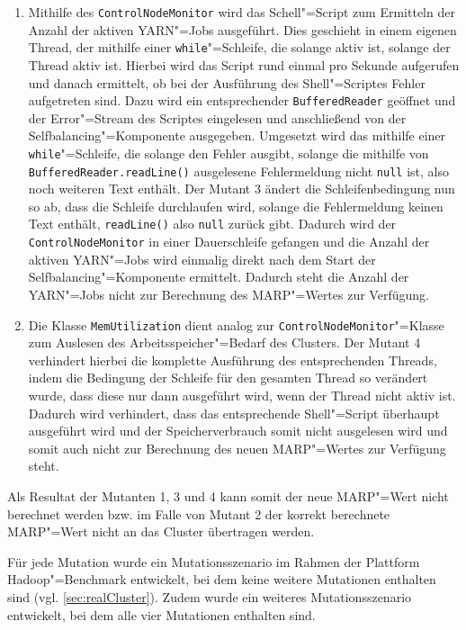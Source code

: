 \begin{enumerate}[itemsep=5pt]
    \item
    Mithilfe des \texttt{ControlNodeMonitor} wird das Schell"=Script zum Ermitteln der Anzahl der aktiven YARN"=Jobs ausgeführt.
    Dies geschieht in einem eigenen Thread, der mithilfe einer \texttt{while}"=Schleife, die solange aktiv ist, solange der Thread aktiv ist.
    Hierbei wird das Script rund einmal pro Sekunde aufgerufen und danach ermittelt, ob bei der Ausführung des Shell"=Scriptes Fehler aufgetreten sind.
    Dazu wird ein entsprechender \texttt{BufferedReader} geöffnet und der Error"=Stream des Scriptes eingelesen und anschließend von der Selfbalancing"=Komponente ausgegeben.
    Umgesetzt wird das mithilfe einer \texttt{while}"=Schleife, die solange den Fehler ausgibt, solange die mithilfe von \texttt{BufferedReader.readLine()} ausgelesene Fehlermeldung nicht \texttt{null} ist, also noch weiteren Text enthält.
    Der Mutant 3 ändert die Schleifenbedingung nun so ab, dass die Schleife durchlaufen wird, solange die Fehlermeldung keinen Text enthält, \texttt{readLine()} also \texttt{null} zurück gibt.
    Dadurch wird der \texttt{ControlNodeMonitor} in einer Dauerschleife gefangen und die Anzahl der aktiven YARN"=Jobs wird einmalig direkt nach dem Start der Selfbalancing"=Komponente ermittelt.
    Dadurch steht die Anzahl der YARN"=Jobs nicht zur Berechnung des \gls{MARP}"=Wertes zur Verfügung.
            
    \item
    Die Klasse \texttt{MemUtilization} dient analog zur \texttt{ControlNodeMonitor}"=Klasse zum Auslesen des Arbeitsspeicher"=Bedarf des Clusters.
    Der Mutant 4 verhindert hierbei die komplette Ausführung des entsprechenden Threads, indem die Bedingung der Schleife für den gesamten Thread so verändert wurde, dass diese nur dann ausgeführt wird, wenn der Thread nicht aktiv ist.
    Dadurch wird verhindert, dass das entsprechende Shell"=Script überhaupt ausgeführt wird und der Speicherverbrauch somit nicht ausgelesen wird und somit auch nicht zur Berechnung des neuen \gls{MARP}"=Wertes zur Verfügung steht.
\end{enumerate}

Als Resultat der Mutanten 1, 3 und 4 kann somit der neue \gls{MARP}"=Wert nicht berechnet werden bzw. im Falle von Mutant 2 der korrekt berechnete \gls{MARP}"=Wert nicht an das Cluster übertragen werden.

Für jede Mutation wurde ein Mutationsszenario im Rahmen der Plattform Hadoop"=Benchmark entwickelt, bei dem keine weitere Mutationen enthalten sind (vgl. \cref{sec:realCluster}).
Zudem wurde ein weiteres Mutationsszenario entwickelt, bei dem alle vier Mutationen enthalten sind.
